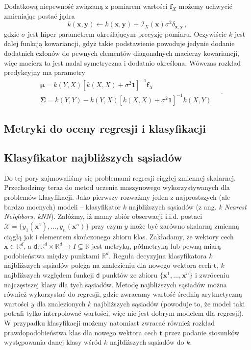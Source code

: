 \documentclass{myclass}
\numberwithin{equation}{section}
\begin{document}
Dodatkową niepewność związaną z pomiarem wartości \(\mathbf{f}_X\) możemy uchwycić zmieniając postać
jądra 
\begin{equation}
    k(\mathbf{x},\mathbf{y}) \leftarrow k(\mathbf{x},\mathbf{y}) + \mathcal{I}_X(\mathbf{x})\sigma^2\delta_{\mathbf{x},\mathbf{y}}\,,
\end{equation}
gdzie \(\sigma\) jest hiper-parametrem określającym precyzję pomiaru. Oczywiście \(k\) jest dalej
funkcją kowariancji, gdyż takie podstawienie powoduje jedynie dodanie dodatnich członów do pewnych
elementów diagonalnych macierzy kowariancji, więc macierz ta jest nadal symetryczna i dodatnio
określona. Wówczas rozkład predykcyjny ma parametry
\begin{equation}
    \begin{split}
        &\boldsymbol{\mu} = k(Y,X)\left[k(X,X) + \sigma^2\mathbf{1}\right]^{-1}\mathbf{f}_X\\
        &\mathbf{\Sigma} = k(Y,Y) - k(Y,X)\left[k(X,X) + \sigma^2\mathbf{1}\right]^{-1}k(X,Y)
    \end{split}\quad.
\end{equation}


\subsection{Metryki do oceny regresji i klasyfikacji}




\subsection{Klasyfikator najbliższych sąsiadów}

Do tej pory zajmowaliśmy się problemami regresji ciągłej zmiennej skalarnej. Przechodzimy teraz do
metod uczenia maszynowego wykorzystywanych dla problemów klasyfikacji. Jako pierwszy rozważmy jeden
z najprostszych (ale bardzo mocnych) modeli -- klasyfikator \(k\) najbliższych sąsiadów (z ang.
\textit{k Nearest Neighbors, kNN}). Załóżmy, iż mamy zbiór obserwacji i.i.d. postaci \(\mathcal{X} =
\{y_1(\mathbf{x}^1), \ldots, y_n(\mathbf{x}^n)\}\) przy czym \(y\) może być zarówno skalarną zmienną
ciągłą jak i elementem skończonego zbioru klas. Zakładamy, że wektory cech \(\mathbf{x} \in
\mathbb{R}^d\), a \(\mathsf{d}: \mathbb{R}^d \times \mathbb{R}^d \mapsto I \subseteq \mathbb{R}\)
jest metryką, półmetryką lub pewną miarą podobieństwa między punktami \(\mathbb{R}^d\). Reguła
decyzyjna klasyfikatora \(k\) najbliższych sąsiadów polega na znalezieniu dla nowego wektora cech
\(\mathbf{t}\), \(k\) najbliższych względem funkcji \(\mathsf{d}\) punktów ze zbioru
\(\{\mathbf{x}^1,\ldots,\mathbf{x}^n\}\) i zwróceniu najczęstszej klasy dla tych sąsiadów. Metodę
najbliższych sąsiadów można również wykorzystać do regresji, gdzie zwracamy wartość średnią
arytmetyczną wartości \(y\) dla znalezionych \(k\) najbliższych sąsiadów (powoduje to, że model taki
potrafi tylko interpolować wartości, więc nie jest dobrym modelem dla regresji). W przypadku
klasyfikacji możemy natomiast zwracać również rozkład prawdopodobieństwa klas dla nowego wektora
cech \(\mathbf{t}\) przez podanie stosunków występowania danej klasy wśród \(k\) najbliższych
sąsiadów do \(k\).
\end{document}
